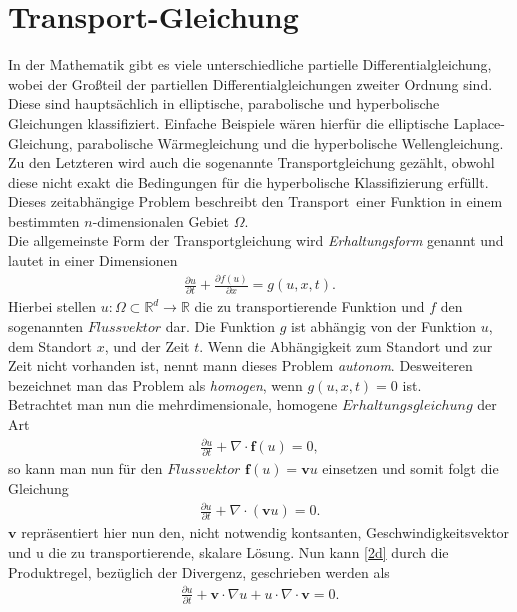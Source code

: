 \documentclass[a4paper,11pt]{article}
\begin{document}
\section{Transport-Gleichung}\label{sec:transglei}
In der Mathematik gibt es viele unterschiedliche partielle Differentialgleichung, wobei der Großteil der partiellen Differentialgleichungen zweiter Ordnung sind. Diese sind hauptsächlich in elliptische, parabolische und hyperbolische Gleichungen klassifiziert. Einfache Beispiele wären hierfür die elliptische Laplace-Gleichung, parabolische Wärmegleichung und die hyperbolische Wellengleichung. Zu den Letzteren wird auch die sogenannte Transportgleichung gezählt, obwohl diese nicht exakt die Bedingungen für die hyperbolische Klassifizierung erfüllt. Dieses zeitabhängige Problem beschreibt den \grqq Transport\grqq~einer Funktion in einem bestimmten $n$-dimensionalen Gebiet $\Omega$.\\
Die allgemeinste Form der Transportgleichung wird \textit{Erhaltungsform} genannt und lautet in einer Dimensionen
\begin{align}
 \frac{\partial u}{\partial t}+\frac{\partial f(u)}{\partial x}=g(u,x,t)\label{1d}.
\end{align}
Hierbei stellen $u:\Omega\subset\mathbb{R}^d\to\mathbb{R}$ die zu transportierende Funktion und $f$ den sogenannten $Flussvektor$ dar. Die Funktion $g$ ist abhängig von der Funktion $u$, dem Standort $x$, und der Zeit $t$. Wenn die Abhängigkeit zum Standort und zur Zeit nicht vorhanden ist, nennt mann dieses Problem \textit{autonom}. Desweiteren bezeichnet man das Problem als \textit{homogen}, wenn $g(u,x,t)=0$ ist.\\
Betrachtet man nun die mehrdimensionale, homogene $Erhaltungsgleichung$ der Art
\begin{align}
 \frac{\partial u}{\partial t}+\nabla\cdot\textbf{f}(u)=0,
\end{align}
so kann man nun für den $Flussvektor$ $\textbf{f}(u)=\textbf{v} u$ einsetzen und somit folgt die Gleichung
\begin{align}
 \frac{\partial u}{\partial t}+\nabla \cdot (\textbf{v}u)=0.\label{2d}
\end{align}
$\textbf{v}$ repräsentiert hier nun den, nicht notwendig kontsanten, Geschwindigkeitsvektor und u die zu transportierende, skalare Lösung. Nun kann \eqref{2d} durch die Produktregel, bezüglich der Divergenz, geschrieben werden als
\begin{align}
  \frac{\partial u}{\partial t}+\textbf{v}\cdot\nabla u + u \cdot \nabla \cdot\textbf{v}=0.
\end{align}
\end{document}
